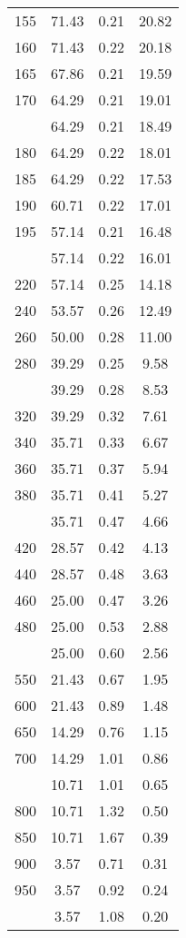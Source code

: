 \begin{table}[ht]
\begin{tabular}{lccc}
  155 & 71.43 & 0.21 & 20.82 \\ 
  160 & 71.43 & 0.22 & 20.18 \\ 
  165 & 67.86 & 0.21 & 19.59 \\ 
  170 & 64.29 & 0.21 & 19.01 \\ 
   \addlinespace
175 & 64.29 & 0.21 & 18.49 \\ 
  180 & 64.29 & 0.22 & 18.01 \\ 
  185 & 64.29 & 0.22 & 17.53 \\ 
  190 & 60.71 & 0.22 & 17.01 \\ 
  195 & 57.14 & 0.21 & 16.48 \\ 
   \addlinespace
200 & 57.14 & 0.22 & 16.01 \\ 
  220 & 57.14 & 0.25 & 14.18 \\ 
  240 & 53.57 & 0.26 & 12.49 \\ 
  260 & 50.00 & 0.28 & 11.00 \\ 
  280 & 39.29 & 0.25 & 9.58 \\ 
   \addlinespace
300 & 39.29 & 0.28 & 8.53 \\ 
  320 & 39.29 & 0.32 & 7.61 \\ 
  340 & 35.71 & 0.33 & 6.67 \\ 
  360 & 35.71 & 0.37 & 5.94 \\ 
  380 & 35.71 & 0.41 & 5.27 \\ 
   \addlinespace
400 & 35.71 & 0.47 & 4.66 \\ 
  420 & 28.57 & 0.42 & 4.13 \\ 
  440 & 28.57 & 0.48 & 3.63 \\ 
  460 & 25.00 & 0.47 & 3.26 \\ 
  480 & 25.00 & 0.53 & 2.88 \\ 
   \addlinespace
500 & 25.00 & 0.60 & 2.56 \\ 
  550 & 21.43 & 0.67 & 1.95 \\ 
  600 & 21.43 & 0.89 & 1.48 \\ 
  650 & 14.29 & 0.76 & 1.15 \\ 
  700 & 14.29 & 1.01 & 0.86 \\ 
   \addlinespace
750 & 10.71 & 1.01 & 0.65 \\ 
  800 & 10.71 & 1.32 & 0.50 \\ 
  850 & 10.71 & 1.67 & 0.39 \\ 
  900 & 3.57 & 0.71 & 0.31 \\ 
  950 & 3.57 & 0.92 & 0.24 \\ 
   \addlinespace
1000 & 3.57 & 1.08 & 0.20 \\ 
   \bottomrule
\end{tabular}
\end{table}

